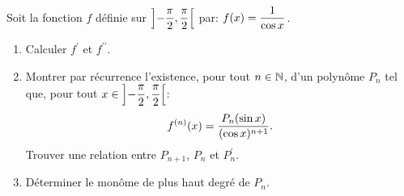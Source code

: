 \documentclass[a4paper, 11pt,reqno]{article}
\begin{document}
\begin{exercice}  \;
	Soit la fonction $f$ d\'efinie sur $\left\rbrack -\displaystyle\frac{\pi}{2},\displaystyle\frac{\pi}{2}\right\lbrack$ par: $f(x)=\displaystyle\frac{1}{\cos{x}}$.
	\begin{enumerate}
		\item Calculer $f^{\prime}$ et $f^{\prime\prime}$.
		\item Montrer par r\'ecurrence l'existence, pour tout $n\in\mathbb{N}$, d'un polyn\^ome $P_n$ tel que, pour tout $x\in\left\rbrack -\displaystyle\frac{\pi}{2},\displaystyle\frac{\pi}{2}\right\lbrack$:
		      $$f^{(n)}(x)=\displaystyle\frac{P_n(\sin{x})}{(\cos{x})^{n+1}}.$$
		      Trouver une relation entre $P_{n+1}$, $P_n$ et $P^{\prime}_n$.
		\item D\'eterminer le mon\^ome de plus haut degr\'e de $P_n$.
	\end{enumerate}
\end{exercice}
\end{document}
